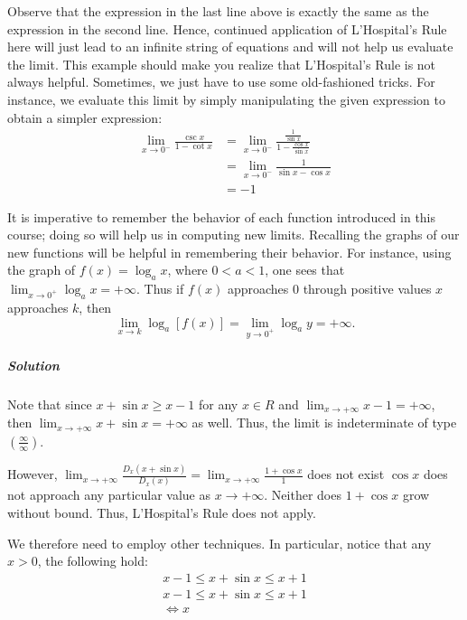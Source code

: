 \documentclass[
  letterpaper,
  DIV=11,
  numbers=noendperiod]{scrartcl}
\let\oldsubparagraph\subparagraph
\renewcommand{\subparagraph}[1]{\oldsubparagraph{#1}\mbox{}}
\theoremstyle{plain}
\theoremstyle{remark}
\begin{document}
Observe that the expression in the last line above is exactly the same
as the expression in the second line. Hence, continued application of
L'Hospital's Rule here will just lead to an infinite string of equations
and will not help us evaluate the limit. This example should make you
realize that L'Hospital's Rule is not always helpful. Sometimes, we just
have to use some old-fashioned tricks. For instance, we evaluate this
limit by simply manipulating the given expression to obtain a simpler
expression: \[
\begin{aligned}
\displaystyle\lim_{x \to 0^-}\frac{\csc x}{1-\cot x}&=\displaystyle\lim_{x \to 0^-}\frac{\frac{1}{\sin x}}{1-\frac{\cos x}{\sin x}}\\&=\displaystyle\lim_{x \to 0^-}\frac{1}{\sin x-\cos x}\\&=-1
\end{aligned}
\]

It is imperative to remember the behavior of each function introduced in
this course; doing so will help us in computing new limits. Recalling
the graphs of our new functions will be helpful in remembering their
behavior. For instance, using the graph of \(f(x)=\log_a x\), where
\(0\lt a \lt 1\), one sees that
\(\displaystyle\lim_{x \to 0^+}\log_a x=+\infty\). Thus if \(f(x)\)
approaches \(0\) through positive values \(x\) approaches \(k\), then \[
\displaystyle\lim_{x \to k}\log_a[f(x)]=\displaystyle\lim_{y \to 0^+}\log_a y=+\infty.
\]

\hypertarget{exm:5.6.6}{}
\hypertarget{solution}{%
\subparagraph{\texorpdfstring{\emph{Solution}}{Solution}}\label{solution}}

Note that since \(x+\sin x \ge x - 1\) for any \(x \in R\) and
\(\displaystyle\lim_{x \to +\infty} {x-1=+\infty}\), then
\(\displaystyle\lim_{x \to +\infty}{x + \sin x = +\infty}\) as well.
Thus, the limit is indeterminate of type
\(\left(\frac{\infty}{\infty}\right)\).

However,
\(\displaystyle\lim_{x \to +\infty}{\frac{D_x(x+\sin x)}{D_x(x)}=\displaystyle\lim_{x \to +\infty}\frac{1+\cos x}{1}}\)
does not exist \(\cos x\) does not approach any particular value as
\(x\to +\infty\). Neither does \(1+\cos x\) grow without bound. Thus,
L'Hospital's Rule does not apply.

We therefore need to employ other techniques. In particular, notice that
any \(x\gt 0\), the following hold: \[
\begin{aligned}
x-1 \le x+\sin x \le x+1 \\
x-1 \le x+\sin x \le x+1\\
\iff x
\end{aligned}
\]
\end{document}
